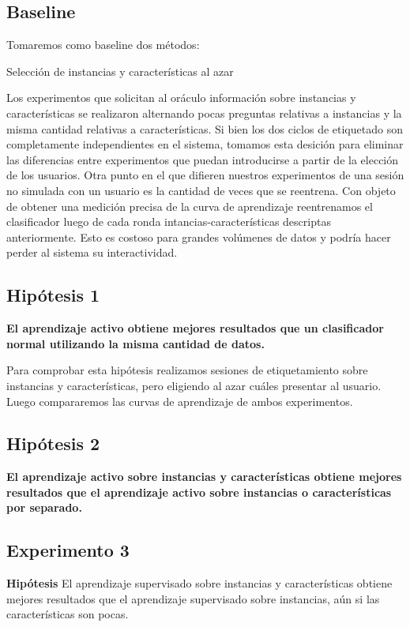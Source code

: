 \subsection{Baseline}
Tomaremos como baseline dos métodos:
\begin{description}
    \item[Selección de instancias y características al azar]
\end{description}

Los experimentos que solicitan al oráculo información sobre instancias y características se realizaron alternando pocas preguntas relativas a instancias y la misma cantidad relativas a características. Si bien los dos ciclos de etiquetado son completamente independientes en el sistema, tomamos esta desición para eliminar las diferencias entre experimentos que puedan introducirse a partir de la elección de los usuarios. Otra punto en el que difieren nuestros experimentos de una sesión no simulada con un usuario es la cantidad de veces que se reentrena. Con objeto de obtener una medición precisa de la curva de aprendizaje reentrenamos el clasificador luego de cada ronda intancias-características descriptas anteriormente. Esto es
costoso para grandes volúmenes de datos y podría hacer perder al sistema su interactividad.

\subsection{Hipótesis 1}
\textbf{El aprendizaje activo obtiene mejores resultados que un clasificador normal utilizando la misma cantidad de datos.}

Para comprobar esta hipótesis realizamos sesiones de etiquetamiento sobre instancias y características, pero eligiendo al azar cuáles presentar al usuario. Luego compararemos las curvas de aprendizaje de ambos experimentos.

\subsection{Hipótesis 2}
\textbf{El aprendizaje activo sobre instancias y características obtiene mejores resultados que el aprendizaje activo sobre instancias o características por separado.}



\subsection{Experimento 3}
\textbf{Hipótesis} El aprendizaje supervisado sobre instancias y características obtiene mejores resultados que el aprendizaje supervisado sobre instancias, aún si las características son pocas.


